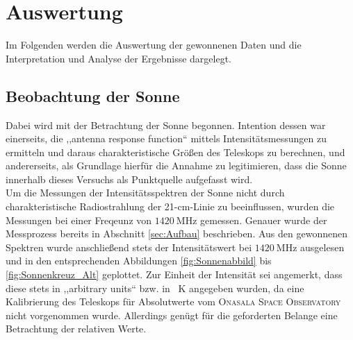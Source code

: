\section{Auswertung}
Im Folgenden werden die Auswertung der gewonnenen Daten und die Interpretation und Analyse der Ergebnisse dargelegt.
    \subsection{Beobachtung der Sonne}
    Dabei wird mit der Betrachtung der Sonne begonnen.
    Intention dessen war einerseits, die ,,antenna response function`` mittels Intensitätsmessungen zu ermitteln und
    daraus charakteristische Größen des Teleskops zu berechnen, und andererseits, als Grundlage hierfür die Annahme zu legitimieren,
    dass die Sonne innerhalb dieses Versuchs als Punktquelle aufgefasst wird.\\

    Um die Messungen der Intensitätsspektren der Sonne nicht durch charakteristische Radiostrahlung der
    21-\si{\centi \metre}-Linie zu beeinflussen,
    wurden die Messungen bei einer Freqeunz von $\SI{1420}{\mega \hertz}$ gemessen.
    Genauer wurde der Messprozess bereits in Abschnitt \ref{sec:Aufbau} beschrieben. 
    Aus den gewonnenen Spektren wurde anschließend stets der Intensitätswert bei $\SI{1420}{\mega \hertz}$ ausgelesen und in den entsprechenden Abbildungen \ref{fig:Sonnenabbild} bis \ref{fig:Sonnenkreuz_Alt} geplottet. 
    Zur Einheit der Intensität sei angemerkt, dass diese stets in ,,arbitrary units`` bzw. in \SI{}{\kelvin} angegeben wurden,
    da eine Kalibrierung des Teleskops für Absolutwerte vom \textsc{Onasala Space Observatory} nicht vorgenommen wurde.
    Allerdings genügt für die geforderten Belange eine Betrachtung der relativen Werte.\\

